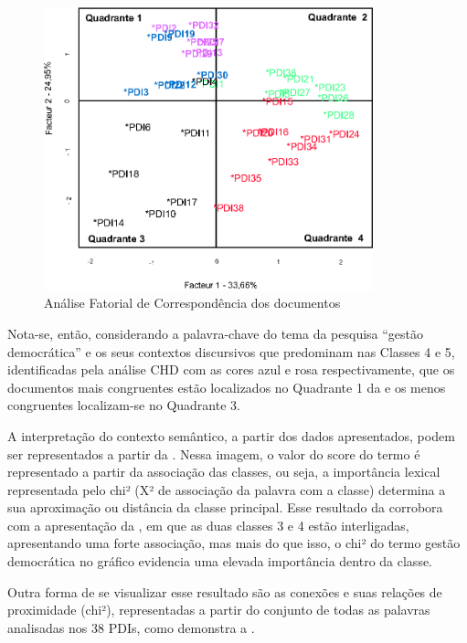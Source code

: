 \documentclass[portuguese]{textolivre}
\begin{document}
\begin{figure}[htbp]
\centering
\includegraphics[width=0.85\textwidth]{fig2.eps}
\caption{Análise Fatorial de Correspondência dos documentos}
\label{fig2}
\end{figure}

Nota-se, então, considerando a palavra-chave do tema da pesquisa “gestão democrática” e os seus contextos discursivos que predominam nas Classes 4 e 5, identificadas pela análise CHD com as cores azul e rosa respectivamente, que os documentos mais congruentes estão localizados no Quadrante 1 da  e os menos congruentes localizam-se no Quadrante 3.

A interpretação do contexto semântico, a partir dos dados apresentados, podem ser representados a partir da . Nessa imagem, o valor do score do termo é representado a partir da associação das classes, ou seja, a importância lexical representada pelo chi² (X² de associação da palavra com a classe) determina a sua aproximação ou distância da classe principal. Esse resultado da  corrobora com a apresentação da , em que as duas classes 3 e 4 estão interligadas, apresentando uma forte associação, mas mais do que isso, o chi² do termo gestão democrática no gráfico evidencia uma elevada importância dentro da classe.

Outra forma de se visualizar esse resultado são as conexões e suas relações de proximidade (chi²), representadas a partir do conjunto de todas as palavras analisadas nos 38 PDIs, como demonstra a .
\end{document}
